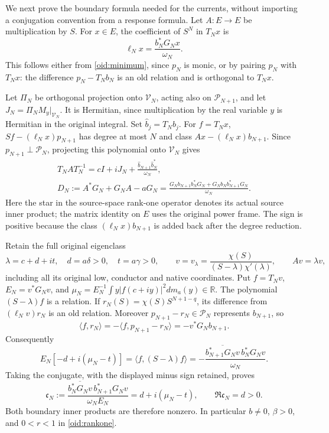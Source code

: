 \documentclass[11pt,a4paper]{article}
\newcommand{\R}{\mathbb R}
\begin{document}
We next prove the boundary formula needed for the currents, without
importing a conjugation convention from a response formula. Let $A:E\to E$
be multiplication by $S$. For $x\in E$, the coefficient of $S^N$ in
$T_Nx$ is
\begin{equation}\label{oid:leading}
 \ell_Nx=\frac{b_N^*G_Nx}{\omega_N}.
\end{equation}
This follows either from \eqref{oid:minimum}, since $p_N$ is monic,
or by pairing $p_N$ with $T_Nx$: the difference $p_N-T_Nb_N$
is an old relation and is orthogonal to $T_Nx$.

Let $\Pi_N$ be orthogonal projection onto $\mathcal V_N$, acting
also on $\mathcal P_{N+1}$, and let
$J_N=\Pi_N M_y|_{\mathcal V_N}$. It is Hermitian, since
multiplication by the real variable $y$ is Hermitian in the original
integral. Set $\widehat b_j=T_Nb_j$. For $f=T_Nx$,
$Sf-(\ell_Nx)p_{N+1}$ has degree at most $N$ and class
$Ax-(\ell_Nx)b_{N+1}$. Since $p_{N+1}\perp\mathcal P_N$,
projecting this polynomial onto $\mathcal V_N$ gives
\begin{equation}\label{oid:action}
 \begin{gathered}
 T_NAT_N^{-1}=cI+iJ_N+
 \frac{\widehat b_{N+1}\widehat b_N^*}{\omega_N},\\
 D_N:=A^*G_N+G_NA-aG_N
 =\frac{G_Nb_{N+1}b_N^*G_N+G_Nb_Nb_{N+1}^*G_N}{\omega_N}.
 \end{gathered}
\end{equation}
Here the star in the source-space rank-one operator denotes its
actual source inner product; the matrix identity on $E$ uses the
original power frame. The sign is positive because the class
$(\ell_Nx)b_{N+1}$ is added back after the degree reduction.

Retain the full original eigenclass
\begin{equation}\label{oid:eigen}
 \lambda=c+d+it,\quad d=a\delta>0,\quad t=a\gamma>0,
 \qquad v=v_\lambda=\frac{\chi(S)}{(S-\lambda)\chi'(\lambda)},
 \qquad Av=\lambda v,
\end{equation}
including all its original low, conductor and native coordinates.
Put $f=T_Nv$, $E_N=v^*G_Nv$, and
$\mu_N=E_N^{-1}\int y|f(c+iy)|^2dm_a(y)\in\R$.
The polynomial $(S-\lambda)f$ is a relation. If
$r_N(S)=\chi(S)S^{N+1-q}$, its difference from
$(\ell_Nv)r_N$ is an old relation. Moreover
$p_{N+1}-r_N\in\mathcal P_N$ represents $b_{N+1}$, so
\[
 \langle f,r_N\rangle=-\langle f,p_{N+1}-r_N\rangle
 =-v^*G_Nb_{N+1}.
\]
Consequently
\[
 E_N[-d+i(\mu_N-t)]
 =\langle f,(S-\lambda)f\rangle
 =-\frac{\overline{b_{N+1}^*G_Nv}\,b_N^*G_Nv}{\omega_N}.
\]
Taking the conjugate, with the displayed minus sign retained, proves
\begin{equation}\label{oid:current}
 \mathfrak c_N
 :=\frac{\overline{b_N^*G_Nv}\,b_{N+1}^*G_Nv}
 {\omega_NE_N}
 =d+i(\mu_N-t),\qquad \Re\mathfrak c_N=d>0.
\end{equation}
Both boundary inner products are therefore nonzero. In particular
$b\ne0$, $\beta>0$, and $0<r<1$ in \eqref{oid:rankone}.
\end{document}

